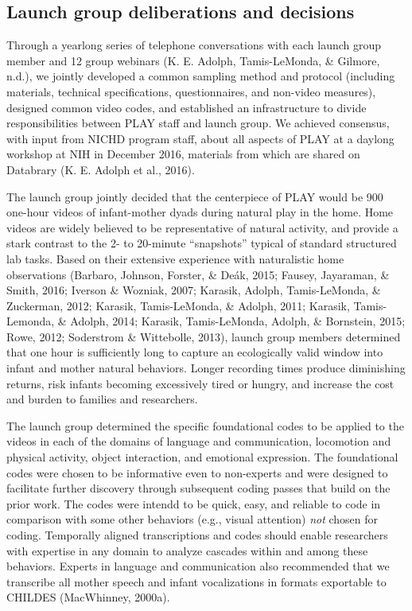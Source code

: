 \documentclass[english,man]{apa6}
\theoremstyle{definition}
\theoremstyle{definition}
\theoremstyle{definition}
\theoremstyle{remark}
\begin{document}
\subsection{Launch group deliberations and
decisions}\label{launch-group-deliberations-and-decisions}

Through a yearlong series of telephone conversations with each launch
group member and 12 group webinars (K. E. Adolph, Tamis-LeMonda, \&
Gilmore, n.d.), we jointly developed a common sampling method and
protocol (including materials, technical specifications, questionnaires,
and non-video measures), designed common video codes, and established an
infrastructure to divide responsibilities between PLAY staff and launch
group. We achieved consensus, with input from NICHD program staff, about
all aspects of PLAY at a daylong workshop at NIH in December 2016,
materials from which are shared on Databrary (K. E. Adolph et al.,
2016).

The launch group jointly decided that the centerpiece of PLAY would be
900 one-hour videos of infant-mother dyads during natural play in the
home. Home videos are widely believed to be representative of natural
activity, and provide a stark contrast to the 2- to 20-minute
\enquote{snapshots} typical of standard structured lab tasks. Based on
their extensive experience with naturalistic home observations (Barbaro,
Johnson, Forster, \& Deák, 2015; Fausey, Jayaraman, \& Smith, 2016;
Iverson \& Wozniak, 2007; Karasik, Adolph, Tamis-LeMonda, \& Zuckerman,
2012; Karasik, Tamis-LeMonda, \& Adolph, 2011; Karasik, Tamis-Lemonda,
\& Adolph, 2014; Karasik, Tamis-LeMonda, Adolph, \& Bornstein, 2015;
Rowe, 2012; Soderstrom \& Wittebolle, 2013), launch group members
determined that one hour is sufficiently long to capture an ecologically
valid window into infant and mother natural behaviors. Longer recording
times produce diminishing returns, risk infants becoming excessively
tired or hungry, and increase the cost and burden to families and
researchers.

The launch group determined the specific foundational codes to be
applied to the videos in each of the domains of language and
communication, locomotion and physical activity, object interaction, and
emotional expression. The foundational codes were chosen to be
informative even to non-experts and were designed to facilitate further
discovery through subsequent coding passes that build on the prior work.
The codes were intendd to be quick, easy, and reliable to code in
comparison with some other behaviors (e.g., visual attention) \emph{not}
chosen for coding. Temporally aligned transcriptions and codes should
enable researchers with expertise in any domain to analyze cascades
within and among these behaviors. Experts in language and communication
also recommended that we transcribe all mother speech and infant
vocalizations in formats exportable to CHILDES (MacWhinney, 2000a).
\end{document}

